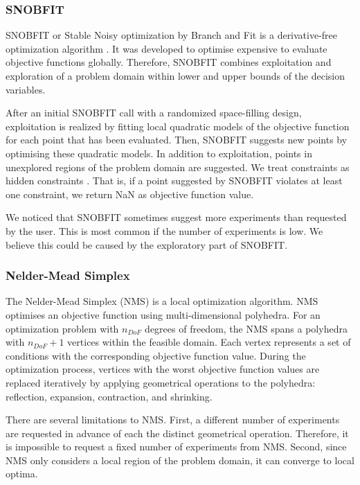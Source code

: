 \subsubsection{SNOBFIT}
SNOBFIT or Stable Noisy optimization by Branch and Fit is a derivative-free optimization algorithm \cite{Huyer2008}. It was developed to optimise expensive to evaluate objective functions globally. Therefore, SNOBFIT combines exploitation and exploration of a problem domain within lower and upper bounds of the decision variables.

After an initial SNOBFIT call with a randomized space-filling design, exploitation is realized by fitting local quadratic  models of the objective function for each point that has been evaluated. Then, SNOBFIT suggests new points by optimising these quadratic models. In addition to exploitation, points in unexplored regions of the problem domain are suggested. We treat constraints as hidden constraints \cite{Huyer2008}. That is, if a point suggested by SNOBFIT violates at least one constraint, we return NaN as objective function value.

We noticed that SNOBFIT sometimes suggest more experiments than requested by the user. This is most common if the number of experiments is low. We believe this could be caused by the exploratory part of SNOBFIT.

 \subsubsection{Nelder-Mead Simplex}
The Nelder-Mead Simplex (NMS)\cite{Nelder1965} is a local optimization algorithm.  NMS optimises an objective function using multi-dimensional polyhedra. For an optimization problem with $n_{DoF}$ degrees of freedom, the NMS spans a polyhedra with $n_{DoF} + 1$ vertices within the feasible domain. Each vertex represents a set of conditions with the corresponding objective function value.  During the optimization process, vertices with the worst objective function values are replaced iteratively by applying geometrical operations to the polyhedra: reflection, expansion, contraction, and shrinking. 

There are several limitations to NMS. First, a different number of experiments are requested in advance of each the distinct geometrical operation. Therefore, it is impossible to request a fixed number of experiments from NMS.  Second, since NMS only considers a local region of the problem domain, it can converge to local optima. 
